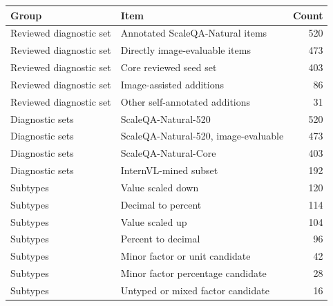\begin{tabular}{llr}
\toprule
Group & Item & Count \\
\midrule
Reviewed diagnostic set & Annotated ScaleQA-Natural items & 520 \\
Reviewed diagnostic set & Directly image-evaluable items & 473 \\
Reviewed diagnostic set & Core reviewed seed set & 403 \\
Reviewed diagnostic set & Image-assisted additions & 86 \\
Reviewed diagnostic set & Other self-annotated additions & 31 \\
\midrule
Diagnostic sets & ScaleQA-Natural-520 & 520 \\
Diagnostic sets & ScaleQA-Natural-520, image-evaluable & 473 \\
Diagnostic sets & ScaleQA-Natural-Core & 403 \\
Diagnostic sets & InternVL-mined subset & 192 \\
\midrule
Subtypes & Value scaled down & 120 \\
Subtypes & Decimal to percent & 114 \\
Subtypes & Value scaled up & 104 \\
Subtypes & Percent to decimal & 96 \\
Subtypes & Minor factor or unit candidate & 42 \\
Subtypes & Minor factor percentage candidate & 28 \\
Subtypes & Untyped or mixed factor candidate & 16 \\
\bottomrule
\end{tabular}
